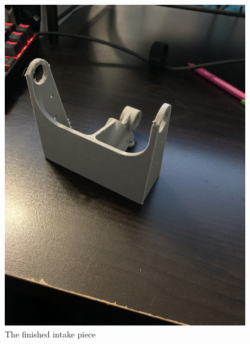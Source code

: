 \begin{figure}[htp]
\centering
\includegraphics[width=0.95\textwidth, angle=0]{Meetings/November/11-23-21/10-23-21_Hardware_Figure3 - Nathan Forrer.JPG}
\caption{The finished intake piece}
\label{fig:pic3}
\end{figure}




